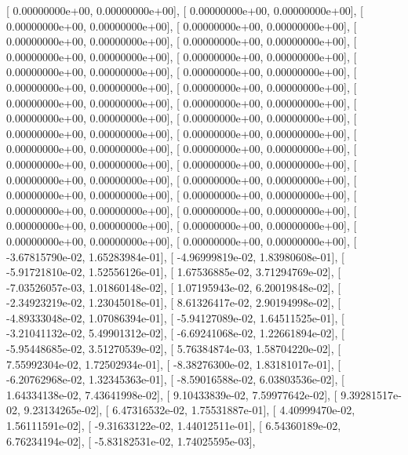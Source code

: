 \documentclass{article}
\begin{document}
       [  0.00000000e+00,   0.00000000e+00],
       [  0.00000000e+00,   0.00000000e+00],
       [  0.00000000e+00,   0.00000000e+00],
       [  0.00000000e+00,   0.00000000e+00],
       [  0.00000000e+00,   0.00000000e+00],
       [  0.00000000e+00,   0.00000000e+00],
       [  0.00000000e+00,   0.00000000e+00],
       [  0.00000000e+00,   0.00000000e+00],
       [  0.00000000e+00,   0.00000000e+00],
       [  0.00000000e+00,   0.00000000e+00],
       [  0.00000000e+00,   0.00000000e+00],
       [  0.00000000e+00,   0.00000000e+00],
       [  0.00000000e+00,   0.00000000e+00],
       [  0.00000000e+00,   0.00000000e+00],
       [  0.00000000e+00,   0.00000000e+00],
       [  0.00000000e+00,   0.00000000e+00],
       [  0.00000000e+00,   0.00000000e+00],
       [  0.00000000e+00,   0.00000000e+00],
       [  0.00000000e+00,   0.00000000e+00],
       [  0.00000000e+00,   0.00000000e+00],
       [  0.00000000e+00,   0.00000000e+00],
       [  0.00000000e+00,   0.00000000e+00],
       [  0.00000000e+00,   0.00000000e+00],
       [  0.00000000e+00,   0.00000000e+00],
       [  0.00000000e+00,   0.00000000e+00],
       [  0.00000000e+00,   0.00000000e+00],
       [  0.00000000e+00,   0.00000000e+00],
       [  0.00000000e+00,   0.00000000e+00],
       [  0.00000000e+00,   0.00000000e+00],
       [  0.00000000e+00,   0.00000000e+00],
       [  0.00000000e+00,   0.00000000e+00],
       [  0.00000000e+00,   0.00000000e+00],
       [ -3.67815790e-02,   1.65283984e-01],
       [ -4.96999819e-02,   1.83980608e-01],
       [ -5.91721810e-02,   1.52556126e-01],
       [  1.67536885e-02,   3.71294769e-02],
       [ -7.03526057e-03,   1.01860148e-02],
       [  1.07195943e-02,   6.20019848e-02],
       [ -2.34923219e-02,   1.23045018e-01],
       [  8.61326417e-02,   2.90194998e-02],
       [ -4.89333048e-02,   1.07086394e-01],
       [ -5.94127089e-02,   1.64511525e-01],
       [ -3.21041132e-02,   5.49901312e-02],
       [ -6.69241068e-02,   1.22661894e-02],
       [ -5.95448685e-02,   3.51270539e-02],
       [  5.76384874e-03,   1.58704220e-02],
       [  7.55992304e-02,   1.72502934e-01],
       [ -8.38276300e-02,   1.83181017e-01],
       [ -6.20762968e-02,   1.32345363e-01],
       [ -8.59016588e-02,   6.03803536e-02],
       [  1.64334138e-02,   7.43641998e-02],
       [  9.10433839e-02,   7.59977642e-02],
       [  9.39281517e-02,   9.23134265e-02],
       [  6.47316532e-02,   1.75531887e-01],
       [  4.40999470e-02,   1.56111591e-02],
       [ -9.31633122e-02,   1.44012511e-01],
       [  6.54360189e-02,   6.76234194e-02],
       [ -5.83182531e-02,   1.74025595e-03],
\end{document}
